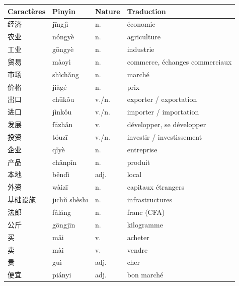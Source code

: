 \documentclass[11pt]{article}
\begin{document}
\begin{center}
\begin{tabularx}{\linewidth}{|X|X|X|X|}
\hline
\rowcolor{popblueL} \textbf{Caractères} & \textbf{Pinyin} & \textbf{Nature} & \textbf{Traduction} \\ \hline
经济 & jīngjì & n. & économie \\ \hline
农业 & nóngyè & n. & agriculture \\ \hline
工业 & gōngyè & n. & industrie \\ \hline
贸易 & màoyì & n. & commerce, échanges commerciaux \\ \hline
市场 & shìchǎng & n. & marché \\ \hline
价格 & jiàgé & n. & prix \\ \hline
出口 & chūkǒu & v./n. & exporter / exportation \\ \hline
进口 & jìnkǒu & v./n. & importer / importation \\ \hline
发展 & fāzhǎn & v. & développer, se développer \\ \hline
投资 & tóuzī & v./n. & investir / investissement \\ \hline
企业 & qǐyè & n. & entreprise \\ \hline
产品 & chǎnpǐn & n. & produit \\ \hline
本地 & běndì & adj. & local \\ \hline
外资 & wàizī & n. & capitaux étrangers \\ \hline
基础设施 & jīchǔ shèshī & n. & infrastructures \\ \hline
法郎 & fǎláng & n. & franc (CFA) \\ \hline
公斤 & gōngjīn & n. & kilogramme \\ \hline
买 & mǎi & v. & acheter \\ \hline
卖 & mài & v. & vendre \\ \hline
贵 & guì & adj. & cher \\ \hline
便宜 & piányi & adj. & bon marché \\ \hline
\end{tabularx}
\end{center}
\end{document}
